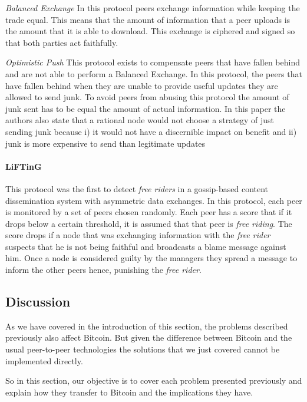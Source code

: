 \textit{Balanced Exchange} In this protocol peers exchange information while keeping the trade equal. This means that the amount of information that a peer uploads is the amount that it is able to download. This exchange is ciphered and signed so that both parties act faithfully.

\textit{Optimistic Push} This protocol exists to compensate peers that have fallen behind and are not able to perform a Balanced Exchange. In this protocol, the peers that have fallen behind when they are unable to provide useful updates they are allowed to send junk. To avoid peers from abusing this protocol the amount of junk sent has to be equal the amount of actual information. In this paper the authors also state that a rational node would not choose a strategy of just sending junk because i) it would not have a discernible impact on benefit and ii) junk is more expensive to send than legitimate updates

\paragraph*{\textbf{LiFTinG} \cite{guerraoui2010lifting}} 
This protocol was the first to detect \textit{free riders} in a gossip-based content dissemination system with asymmetric data exchanges.
In this protocol, each peer is monitored by a set of peers chosen randomly. Each peer has a score that if it drops below a certain threshold, it is assumed that that peer is \textit{free riding}. The score drops if a node that was exchanging information with the \textit{free rider} suspects that he is not being faithful and broadcasts a blame message against him. Once a node is considered guilty by the managers they spread a message to inform the other peers hence, punishing the \textit{free rider}.


\subsection{Discussion}
\label{sec:rpsummary}
As we have covered in the introduction of this section, the problems described previously also affect Bitcoin. But given the difference between Bitcoin and the usual peer-to-peer technologies the solutions that we just covered cannot be implemented directly.

So in this section, our objective is to cover each problem presented previously and explain how they transfer to Bitcoin and the implications they have. 

